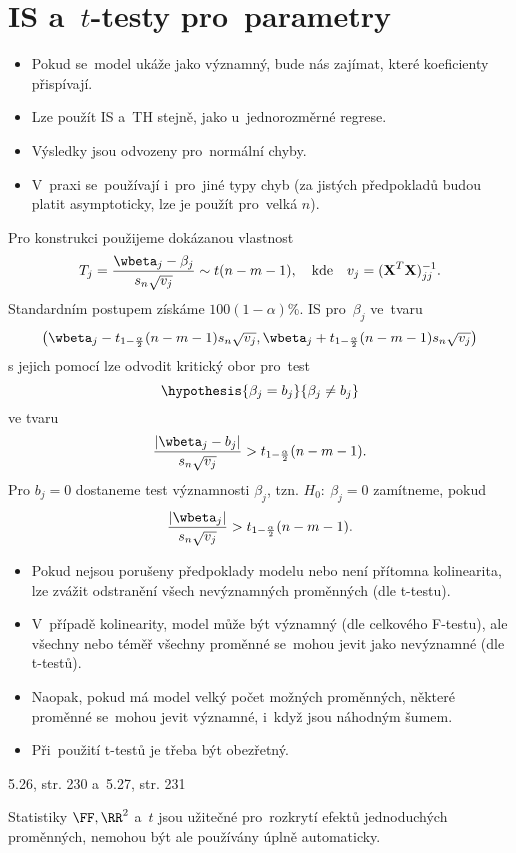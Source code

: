 \section{IS a~$t$-testy pro~parametry}
\begin{itemize}
	\item Pokud se~model ukáže jako významný, bude nás zajímat, které koeficienty přispívají.
	\item Lze použít IS a~TH stejně, jako u~jednorozměrné regrese.
	\item Výsledky jsou odvozeny pro~normální chyby.
	\item V~praxi se~používají i~pro~jiné typy chyb (za jistých předpokladů budou platit asymptoticky, lze je použít pro~velká $n$). 
\end{itemize}
Pro konstrukci použijeme dokázanou vlastnost
$$ T_j=\frac{\wbeta_j-\beta_j}{s_n\sqrt{v_j}}\sim t(n-m-1),\quad\text{kde}\quad v_j=(\textbf{X}^T\textbf{X})_{jj}^{-1}.$$
Standardním postupem získáme $100(1-\alpha)$\%. IS pro~$\beta_j$ ve~tvaru
$$\big( \wbeta_j-t_{1-\frac{\alpha}{2}}(n-m-1)s_n\sqrt{v_j},\wbeta_j+t_{1-\frac{\alpha}{2}}(n-m-1)s_n\sqrt{v_j} \big)$$
s jejich pomocí lze odvodit kritický obor pro~test
$$\hypothesis{\beta_j=b_j}{\beta_j\neq b_j}$$
ve tvaru
$$ \frac{|\wbeta_j-b_j|}{s_n\sqrt{v_j}}>t_{1-\frac{\alpha}{2}}(n-m-1).$$
Pro $b_j=0$ dostaneme test významnosti $\beta_j$, tzn. $H_0:~\beta_j=0$ zamítneme, pokud 
$$ \frac{|\wbeta_j|}{s_n\sqrt{v_j}}>t_{1-\frac{\alpha}{2}}(n-m-1).$$
\begin{remark}
	\begin{itemize}
		\item Pokud nejsou porušeny předpoklady modelu nebo není přítomna kolinearita, lze zvážit odstranění všech nevýznamných proměnných (dle t-testu).
		\item V~případě kolinearity, model může být významný (dle celkového F-testu), ale všechny nebo téměř všechny proměnné se~mohou jevit jako nevýznamné (dle t-testů).
		\item Naopak, pokud má model velký počet možných proměnných, některé proměnné se~mohou jevit významné, i~když jsou náhodným šumem.
		\item Při~použití t-testů je třeba být obezřetný.
	\end{itemize}
\end{remark}
\begin{example}
	5.26, str. 230 a~5.27, str. 231
\end{example}
\begin{remark}
	Statistiky $\FF,\RR^2$ a~$t$ jsou užitečné pro~rozkrytí efektů jednoduchých proměnných, nemohou být ale používány úplně automaticky.
\end{remark}

